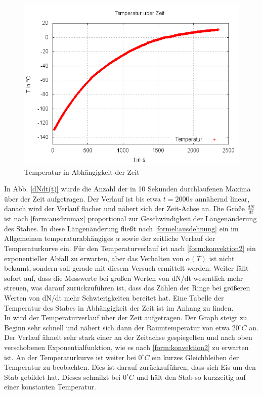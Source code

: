 \begin{figure}
\centering
	\includegraphics[width=.8\textwidth]{images/T(t).png}
\caption{Temperatur in Abhängigkeit der Zeit}
\label{plot:Tt}
\end{figure}

In Abb. \ref{dNdt(t)} wurde die Anzahl der in 10 Sekunden durchlaufenen Maxima über der Zeit aufgetragen. Der Verlauf
ist bis etwa $ t = 2000 s$ annähernd linear, danach wird der Verlauf flacher und nähert sich der Zeit-Achse an. Die Größe
$ \frac{dN}{dt} $ ist nach \eqref{form:ausdzumax} proportional zur Geschwindigkeit der Längenänderung des Stabes. In diese
Längenänderung fließt nach \eqref{formel:ausdehnung} ein im Allgemeinen temperaturabhängiges $ \alpha $ sowie der zeitliche 
Verlauf der Temperaturkurve ein. Für den Temperaturverlauf ist nach \eqref{form:konvektion2} ein exponentieller Abfall
zu erwarten, aber das Verhalten von $ \alpha(T) $ ist nicht bekannt, sondern soll gerade mit diesem Versuch ermittelt werden. 
Weiter fällt sofort auf, dass die Messwerte bei großen Werten von dN/dt wesentlich
mehr streuen, was darauf zurückzuführen ist, dass das Zählen der Ringe bei größeren Werten von dN/dt mehr 
Schwierigkeiten bereitet hat.
Eine Tabelle der Temperatur des Stabes in Abhängigkeit der Zeit ist im Anhang zu finden. \\


In  wird der Temperaturverlauf über der Zeit aufgetragen. Der Graph steigt zu Beginn sehr schnell und nähert
sich dann der Raumtemperatur von etwa $ 20 ^{\circ} C $ an. Der Verlauf ähnelt sehr stark einer an der Zeitachse 
gespiegelten und nach oben verschobenen Exponentialfunktion, wie es nach \eqref{form:konvektion2} zu erwarten ist. 
An der Temperaturkurve ist weiter bei $ 0 ^{\circ} C $ ein kurzes Gleichbleiben der Temperatur zu beobachten. Dies ist darauf zurückzuführen, dass sich Eis um den Stab gebildet hat. Dieses schmilzt bei $ 0 ^{\circ} C $ und hält den Stab so kurzzeitig auf einer konstanten Temperatur.


